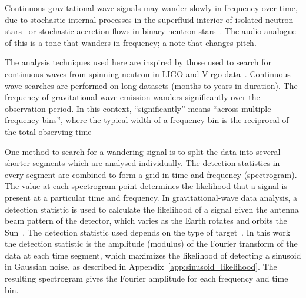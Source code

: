 \documentclass[paper-main.tex]{subfiles}
\begin{document}
Continuous gravitational wave signals may wander slowly in frequency over time, due to stochastic internal processes in the superfluid interior of isolated neutron stars~\cite{MelatosDouglassSimula:2015,Jones:2010} or stochastic accretion flows in binary neutron stars~\cite{BildstenTB:1998}. 
The audio analogue of this is a tone that wanders in frequency; a note that changes pitch. 


The analysis techniques used here are inspired by those used to search for continuous waves from spinning neutron in LIGO and Virgo data~\cite{SuvorovaEtAl:2016,SuvorovaEtAl:2017}.
Continuous wave searches are performed on long datasets (months to years in duration). 
The frequency of gravitational-wave emission wanders significantly over the observation period. 
In this context, ``significantly'' means ``across multiple frequency bins'', where the typical width of a frequency bin is the reciprocal of the total observing time~\cite{JKS:1998,ScoX1O2Viterbi:2019}





One method to search for a wandering signal is to split the data into several shorter segments which are analysed individually. 
The detection statistics in every segment are combined to form a grid in time and frequency (spectrogram). 
The value at each spectrogram point determines the likelihood that a signal is present at a particular time and frequency. 
In gravitational-wave data analysis, a detection statistic is used to calculate the likelihood of a signal given the antenna beam pattern of the detector, which varies as the Earth rotates and orbits the Sun~\cite{JKS:1998}.
The detection statistic used depends on the type of target~\cite{JKS:1998,SuvorovaEtAl:2017}. 
In this work the detection statistic is the amplitude (modulus) of the Fourier transform of the data at each time segment, which maximizes the likelihood of detecting a sinusoid in Gaussian noise, as described in Appendix~\ref{app:sinusoid_likelihood}. 
The resulting spectrogram gives the Fourier amplitude for each frequency and time bin. 
\end{document}
